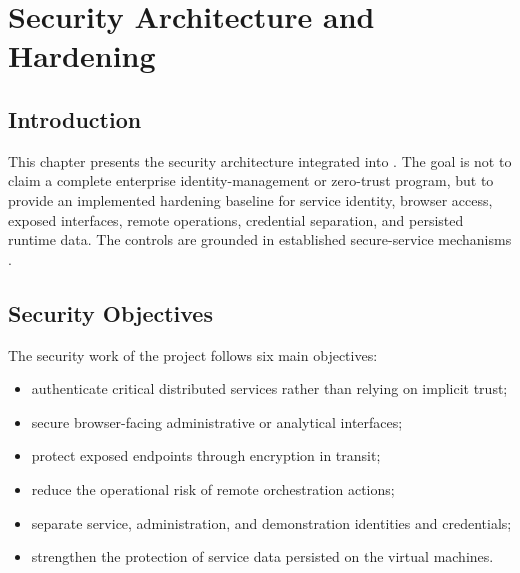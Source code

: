 \chapter{Security Architecture and Hardening}

\section{Introduction}
This chapter presents the security architecture integrated into \projectname{}. The goal is not to claim a complete enterprise identity-management or zero-trust program, but to provide an implemented hardening baseline for service identity, browser access, exposed interfaces, remote operations, credential separation, and persisted runtime data. The controls are grounded in established secure-service mechanisms \cite{mit_kerberos_docs,apache_hadoop_docs,openssh_docs,cryptsetup_docs}.

\section{Security Objectives}
The security work of the project follows six main objectives:
\begin{itemize}
    \item authenticate critical distributed services rather than relying on implicit trust;
    \item secure browser-facing administrative or analytical interfaces;
    \item protect exposed endpoints through encryption in transit;
    \item reduce the operational risk of remote orchestration actions;
    \item separate service, administration, and demonstration identities and credentials;
    \item strengthen the protection of service data persisted on the virtual machines.
\end{itemize}

